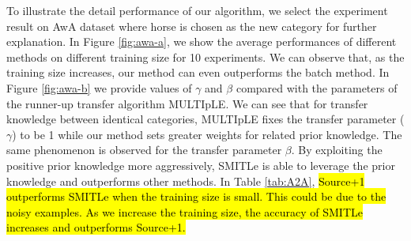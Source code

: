 To illustrate the detail performance of our algorithm, we select the experiment result on AwA dataset where horse is chosen as the new category for further explanation. In Figure \ref{fig:awa-a}, we show the average performances of different methods on different training size for 10 experiments. We can observe that, as the training size increases, our method can even outperforms the batch method.
In Figure \ref{fig:awa-b} we provide values of $\gamma$ and $\beta$ compared with the parameters of the runner-up transfer algorithm MULTIpLE. We can see that for transfer knowledge between identical categories, MULTIpLE fixes the transfer parameter ($\gamma$) to be 1 while our method sets greater weights for related prior knowledge. The same phenomenon is observed for the transfer parameter $\beta$. By exploiting the positive prior knowledge more aggressively, SMITLe is able to leverage the prior knowledge and outperforms other methods. In Table \ref{tab:A2A}, \hl{Source+1 outperforms SMITLe when the training size is small. This could be due to the noisy examples. As we increase the training size, the accuracy of SMITLe increases and outperforms Source+1. }


